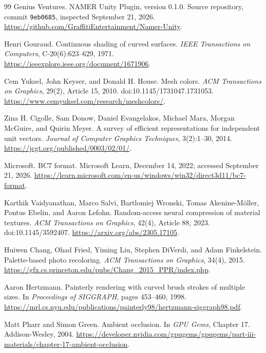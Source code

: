 \documentclass[11pt,letterpaper]{article}
\newcommand{\shortcommit}{9eb0685}
\newcommand{\code}[1]{\texttt{#1}}
\begin{document}
\FloatBarrier
\begin{thebibliography}{99}
\small
{}
Genius Ventures.
\newblock NAMER Unity Plugin, version 0.1.0.
\newblock Source repository, commit \code{\shortcommit}, inspected September 21, 2026.
\newblock \url{https://github.com/GraffitiEntertainment/Namer-Unity}.

Henri Gouraud.
\newblock Continuous shading of curved surfaces.
\newblock \emph{IEEE Transactions on Computers}, C-20(6):623--629, 1971.
\newblock \url{https://ieeexplore.ieee.org/document/1671906}.

Cem Yuksel, John Keyser, and Donald H. House.
\newblock Mesh colors.
\newblock \emph{ACM Transactions on Graphics}, 29(2), Article 15, 2010.
\newblock doi:10.1145/1731047.1731053.
\newblock \url{https://www.cemyuksel.com/research/meshcolors/}.

Zina H. Cigolle, Sam Donow, Daniel Evangelakos, Michael Mara, Morgan McGuire, and Quirin Meyer.
\newblock A survey of efficient representations for independent unit vectors.
\newblock \emph{Journal of Computer Graphics Techniques}, 3(2):1--30, 2014.
\newblock \url{https://jcgt.org/published/0003/02/01/}.

Microsoft.
\newblock BC7 format.
\newblock Microsoft Learn, December 14, 2022; accessed September 21, 2026.
\newblock \url{https://learn.microsoft.com/en-us/windows/win32/direct3d11/bc7-format}.

Karthik Vaidyanathan, Marco Salvi, Bartlomiej Wronski, Tomas Akenine-M\"oller, Pontus Ebelin, and Aaron Lefohn.
\newblock Random-access neural compression of material textures.
\newblock \emph{ACM Transactions on Graphics}, 42(4), Article 88, 2023.
\newblock doi:10.1145/3592407.
\newblock \url{https://arxiv.org/abs/2305.17105}.

Huiwen Chang, Ohad Fried, Yiming Liu, Stephen DiVerdi, and Adam Finkelstein.
\newblock Palette-based photo recoloring.
\newblock \emph{ACM Transactions on Graphics}, 34(4), 2015.
\newblock \url{https://gfx.cs.princeton.edu/pubs/Chang_2015_PPR/index.php}.

Aaron Hertzmann.
\newblock Painterly rendering with curved brush strokes of multiple sizes.
\newblock In \emph{Proceedings of SIGGRAPH}, pages 453--460, 1998.
\newblock \url{https://mrl.cs.nyu.edu/publications/painterly98/hertzmann-siggraph98.pdf}.

Matt Pharr and Simon Green.
\newblock Ambient occlusion.
\newblock In \emph{GPU Gems}, Chapter 17. Addison-Wesley, 2004.
\newblock \url{https://developer.nvidia.com/gpugems/gpugems/part-iii-materials/chapter-17-ambient-occlusion}.


\end{thebibliography}
\end{document}
